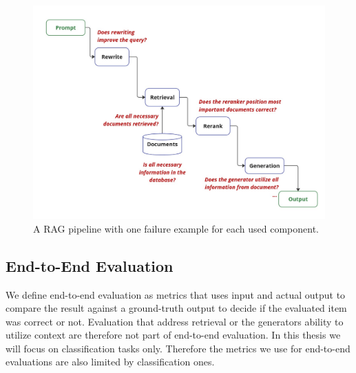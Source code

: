 \begin{figure}
  \centering
  \includegraphics[width=\textwidth]{images/FailurePointExamples.pdf}
  \caption{A RAG pipeline with one failure example for each used component.}
  \label{fig:failures}
\end{figure}

\subsection{End-to-End Evaluation}

We define end-to-end evaluation as metrics that uses input and actual output to compare the result against a ground-truth output to decide if the evaluated item was correct or not. Evaluation that address retrieval or the generators ability to utilize context are therefore not part of end-to-end evaluation. In this thesis we will focus on classification tasks only. Therefore the metrics we use for end-to-end evaluations are also limited by classification ones. 

